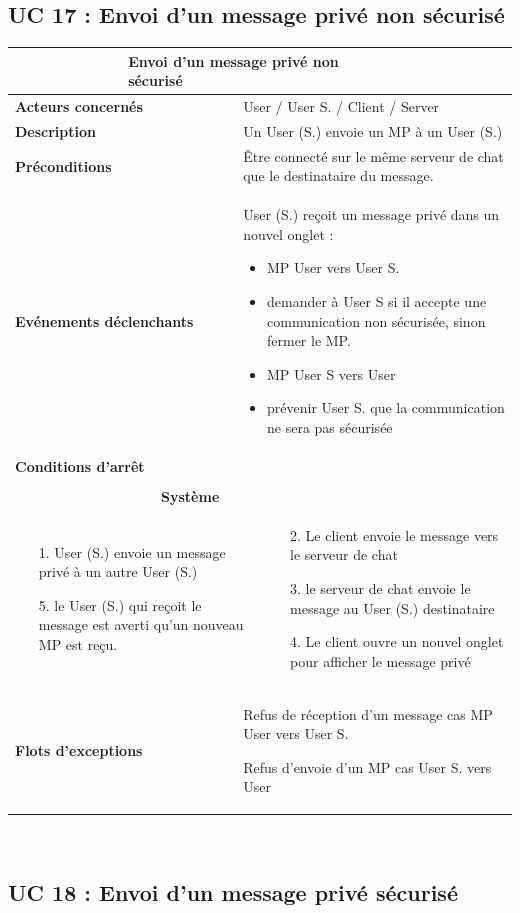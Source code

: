 \documentclass[a4paper,11pt,french]{article}
\newcommand{\fiche}[9] {
	\noindent
\begin{tabular}{|p{3.5cm}| p{1cm} | p{3cm} | p{.5cm} | p{7cm}|} 
\hline
\rowcolor{blue}
\multicolumn{2}{|l|}{\color{white}\bfseries{Nom}} & \multicolumn{3}{l|}{\color{white}\bfseries{#1}}\\
\hline
\multicolumn{2}{|l|}{\bfseries{Acteurs concernés}} & \multicolumn{3}{m{10.5cm}|}{#2}\\
\hline
\multicolumn{2}{|l|}{\bfseries{Description}} & \multicolumn{3}{m{10.5cm}|}{#3}\\
\hline
\multicolumn{2}{|l|}{\bfseries{Préconditions}} & \multicolumn{3}{m{10.5cm}|}{#4}\\
\hline
\multicolumn{2}{|l|}{\bfseries{Evénements déclenchants}} & \multicolumn{3}{m{10.5cm}|}{#5}\\
\hline
\multicolumn{2}{|l|}{\bfseries{Conditions d'arrêt}} & \multicolumn{3}{m{10.5cm}|}{#6}\\
\hline
\rowcolor{gray}
\multicolumn{5}{|c|}{\bfseries{Description du flot d'événements principal}}\\
\hline
\rowcolor{gray}
\multicolumn{3}{|c|}{\bfseries{Acteur(s)}} & \multicolumn{2}{c|}{\bfseries{Système}}\\
\hline
\multicolumn{3}{|p{7.5cm}|}{#7} & \multicolumn{2}{p{7.5cm}|}{#8}\\
\hline
\multicolumn{2}{|l}{\bfseries{Flots d'exceptions}} & \multicolumn{3}{|p{11.5cm}|}{#9}\\
\hline
\end{tabular}
\\
}
\begin{document}
\subsection{UC 17 : Envoi d’un message privé non sécurisé}

\fiche
	{Envoi d’un message privé non sécurisé} %
	{User / User S. / Client / Server} %
	{Un User (S.) envoie un MP à un User (S.)} %
	{Être connecté sur le même serveur de chat que le destinataire du message.} %
	{User (S.) reçoit un message privé dans un nouvel onglet :
		\begin{itemize}
			\item MP User vers User S.
			\item demander à User S si il accepte une communication non sécurisée, sinon fermer le MP.
			\item MP User S vers User
			\item prévenir User S. que la communication ne sera pas sécurisée	
		\end{itemize}
	} %
	{} %
	{\begin{itemize}  %
		\item [1.] User (S.) envoie un message privé à un autre User (S.) 
		\item []
		\item []
		\item [5.] le User (S.) qui reçoit le message est averti qu’un nouveau MP est reçu.
	 \end{itemize}
	} 
	{\begin{itemize}  %
		\item []
		\item [2.] Le client envoie le message vers le serveur de chat
		\item [3.] le serveur de chat envoie le message au User (S.) destinataire
		\item [4.] Le client ouvre un nouvel onglet pour afficher le message privé
	 \end{itemize}
	 }
	{Refus de réception d’un message cas MP User vers User S.
	
	Refus d’envoie d’un MP cas User S. vers User} %

\subsection{UC 18 : Envoi d’un message privé sécurisé}
\end{document}
